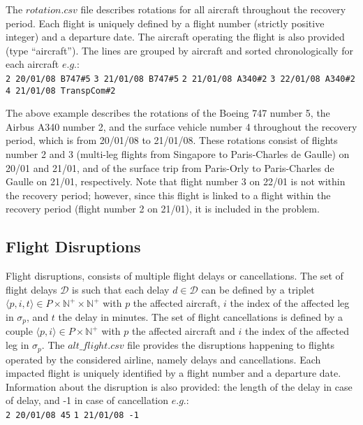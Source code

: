 \documentclass[ijoo,nonblindrev]{informs-ijoo}
\begin{document}
The $rotation.csv $ file describes rotations for all aircraft throughout the recovery period. Each flight is uniquely defined by a flight number (strictly positive integer) and a departure date. The aircraft operating the flight is also provided (type “aircraft”). The lines are grouped by aircraft and sorted chronologically for each aircraft $e.g.$:\\
\newline
{\texttt{\footnotesize 2 20/01/08 B747\#5}}
\newline
{\texttt{\footnotesize 3 21/01/08 B747\#5}}
\newline
{\texttt{\footnotesize 2 21/01/08 A340\#2}}
\newline
{\texttt{\footnotesize 3 22/01/08 A340\#2}}
\newline
{\texttt{\footnotesize 4 21/01/08 TranspCom\#2}}
\newline

The above example describes the rotations of the Boeing 747 number 5, the Airbus A340 number 2, and the surface vehicle number 4 throughout the recovery period, which is from 20/01/08 to 21/01/08. These rotations consist of flights number 2 and 3 (multi-leg flights from Singapore to Paris-Charles de Gaulle) on 20/01 and 21/01, and of the surface trip from Paris-Orly to Paris-Charles de Gaulle on 21/01, respectively. Note that flight number 3 on 22/01 is not within the recovery period; however, since this flight is linked to a flight within the recovery period (flight number 2 on 21/01), it is included in the problem.

\subsection{Flight Disruptions} \label{subsec:flightDisr}


	Flight disruptions, consists of multiple flight delays or cancellations. The set of flight delays $ \mathcal{D} $ is such that each delay $ d \in \mathcal{D}$ can be defined by a triplet $\langle p, i, t \rangle \in P \times \mathbb{N}^{+}  \times \mathbb{N}^{+}$ with $p$ the affected aircraft, $i$ the index of the affected leg in $ \sigma_p$, and $t$ the delay in minutes. The set of flight cancellations is defined by a couple $\langle p,i \rangle \in  P \times \mathbb{N}^{+}$ with $p$ the affected aircraft and $i$ the index of the affected leg in $ \sigma_p$.
	The $alt\_flight.csv$ file provides the disruptions happening to flights operated by the considered airline, namely delays and cancellations. Each impacted flight is uniquely identified by a flight number and a departure date. Information about the disruption is also provided: the length of the delay in case of delay, and -1 in
	case of cancellation $e.g.$:\\
	\newline
	{\texttt{\footnotesize 2 20/01/08 45}}
	\newline
	{\texttt{\footnotesize 1 21/01/08 -1}}
	\newline
	
\end{document}
